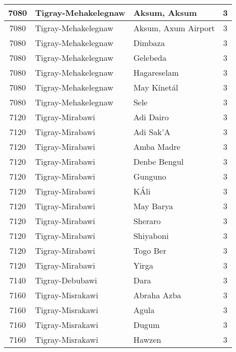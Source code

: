 \documentclass[12pt,a4paper]{report}
\begin{document}
\begin{tabular}{|c|l|l|c|}
\hline 
\rule[-1ex]{0pt}{2.5ex} 7080 & Tigray-Mehakelegnaw & Aksum, Aksum & 3 \\
\hline 
\rule[-1ex]{0pt}{2.5ex} 7080 & Tigray-Mehakelegnaw & Aksum, Axum Airport & 3 \\
\hline 
\rule[-1ex]{0pt}{2.5ex} 7080 & Tigray-Mehakelegnaw & Dimbaza & 3 \\
\hline 
\rule[-1ex]{0pt}{2.5ex} 7080 & Tigray-Mehakelegnaw & Gelebeda & 3 \\
\hline 
\rule[-1ex]{0pt}{2.5ex} 7080 & Tigray-Mehakelegnaw & Hagareselam & 3 \\
\hline 
\rule[-1ex]{0pt}{2.5ex} 7080 & Tigray-Mehakelegnaw & May K\'inet\'al & 3 \\
\hline 
\rule[-1ex]{0pt}{2.5ex} 7080 & Tigray-Mehakelegnaw & Sele & 3 \\
\hline 
\rule[-1ex]{0pt}{2.5ex} 7120 & Tigray-Mirabawi & Adi Dairo & 3 \\
\hline 
\rule[-1ex]{0pt}{2.5ex} 7120 & Tigray-Mirabawi & Adi Sak'A & 3 \\
\hline 
\rule[-1ex]{0pt}{2.5ex} 7120 & Tigray-Mirabawi & Amba Madre & 3 \\
\hline 
\rule[-1ex]{0pt}{2.5ex} 7120 & Tigray-Mirabawi & Denbe Bengul & 3 \\
\hline 
\rule[-1ex]{0pt}{2.5ex} 7120 & Tigray-Mirabawi & Gunguno & 3 \\
\hline 
\rule[-1ex]{0pt}{2.5ex} 7120 & Tigray-Mirabawi & K\'Ali & 3 \\
\hline 
\rule[-1ex]{0pt}{2.5ex} 7120 & Tigray-Mirabawi & May Barya & 3 \\
\hline 
\rule[-1ex]{0pt}{2.5ex} 7120 & Tigray-Mirabawi & Sheraro & 3 \\
\hline 
\rule[-1ex]{0pt}{2.5ex} 7120 & Tigray-Mirabawi & Shiyaboni & 3 \\
\hline 
\rule[-1ex]{0pt}{2.5ex} 7120 & Tigray-Mirabawi & Togo Ber & 3 \\
\hline 
\rule[-1ex]{0pt}{2.5ex} 7120 & Tigray-Mirabawi & Yirga & 3 \\
\hline 
\rule[-1ex]{0pt}{2.5ex} 7140 & Tigray-Debubawi & Dara & 3 \\
\hline 
\rule[-1ex]{0pt}{2.5ex} 7160 & Tigray-Misrakawi & Abraha Azba & 3 \\
\hline 
\rule[-1ex]{0pt}{2.5ex} 7160 & Tigray-Misrakawi & Agula & 3 \\
\hline 
\rule[-1ex]{0pt}{2.5ex} 7160 & Tigray-Misrakawi & Dugum & 3 \\
\hline 
\rule[-1ex]{0pt}{2.5ex} 7160 & Tigray-Misrakawi & Hawzen & 3 \\

\end{tabular}
\end{document}
